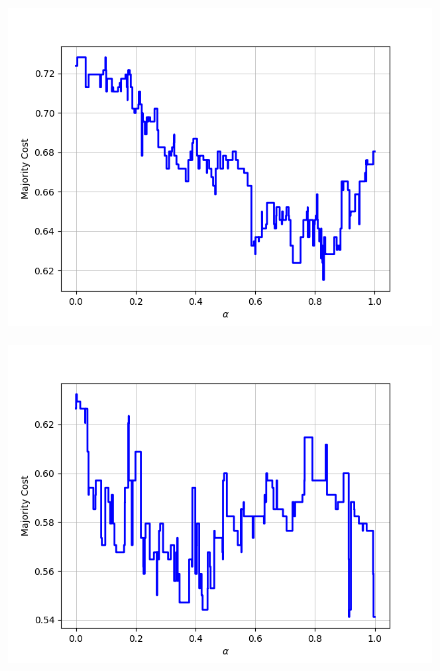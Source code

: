 \begin{figure}[H]
\begin{minipage}{.24\textwidth}
  {\includegraphics[width=\linewidth]{plots/omniglot-intra-ac-cnn/Sanskrit}}
\end{minipage}
\begin{minipage}{.24\textwidth}
  \centering
  {\includegraphics[width=\linewidth]{plots/omniglot-intra-ac-cnn/Syriac_(Estrangelo)}}
\end{minipage}
\begin{minipage}{.24\textwidth}
  \centering

\end{minipage}
\end{figure}
